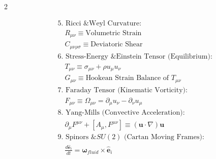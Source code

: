 \documentclass[11pt, a4paper]{article}
\newcounter{cheatnum}
\begin{document}
\begin{multicols}{2}
\begin{tcolorbox}[cheatbox, title={\refstepcounter{cheatnum}\label{box:rosetta_stone}\thecheatnum. Tensor Evolution \& Geometry\scriptsize\hfill\hyperref[sec:deriv_rosetta_stone]{[Proof $\downarrow$]}}]
\begin{align}
    &\text{5. Ricci \& Weyl Curvature:} \nonumber \\
    &\quad R_{\mu\nu} \equiv \text{Volumetric Strain} \label{eq:rosetta_ricci} \\ 
    &\quad C_{\mu\nu\rho\sigma} \equiv \text{Deviatoric Shear} \label{eq:rosetta_weyl} \\
    &\text{6. Stress-Energy \& Einstein Tensor (Equilibrium):} \nonumber \\
    &\quad T_{\mu\nu} \equiv \sigma_{\mu\nu} + \rho u_\mu u_\nu \label{eq:rosetta_stress_energy} \\
    &\quad G_{\mu\nu} \equiv \text{Hookean Strain Balance of } T_{\mu\nu} \label{eq:rosetta_einstein_tensor} \\
    &\text{7. Faraday Tensor (Kinematic Vorticity):} \nonumber \\
    &\quad F_{\mu\nu} \equiv \Omega_{\mu\nu} = \partial_\mu u_\nu - \partial_\nu u_\mu \label{eq:rosetta_faraday} \\
    &\text{8. Yang-Mills (Convective Acceleration):} \nonumber \\
    &\quad \partial_\mu F^{\mu\nu} + [A_\mu, F^{\mu\nu}] \equiv (\mathbf{u} \cdot \nabla)\mathbf{u} \label{eq:rosetta_yang_mills} \\
    &\text{9. Spinors \& $SU(2)$ (Cartan Moving Frames):} \nonumber \\
    &\quad \frac{d\mathbf{\hat{e}}_i}{dt} = \boldsymbol{\omega}_{fluid} \times \mathbf{\hat{e}}_i \label{eq:rosetta_cartan}
\end{align}
\end{tcolorbox}


\end{multicols}
\end{document}
